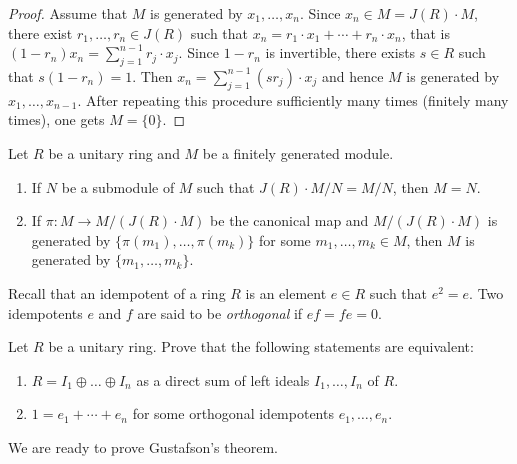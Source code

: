 \begin{proof}
	Assume that $M$ is generated by 
    $x_1,\dots,x_n$. Since $x_n\in M=J(R)\cdot M$, 
	there exist $r_1,\dots,r_n\in J(R)$ such that  $x_n=r_1\cdot x_1+\cdots+r_n\cdot x_n$, that is 
	$(1-r_n)x_n=\sum_{j=1}^{n-1}r_j\cdot x_j$. 
	Since $1-r_n$ is invertible, there exists 
    $s\in R$ such that $s(1-r_n)=1$. Then
	$x_n=\sum_{j=1}^{n-1}(sr_j)\cdot x_j$ 
	and hence $M$ is generated by $x_1,\dots,x_{n-1}$. After repeating this procedure sufficiently many times (finitely many times), one gets $M=\{0\}$.
\end{proof}

\begin{exercise}
\label{xca:Nakayama}
    Let $R$ be a unitary ring and $M$ be a finitely
    generated module. 
    \begin{enumerate}
        \item If $N$ be a submodule of $M$ such that $J(R)\cdot M/N=M/N$, then $M=N$. 
        \item If $\pi\colon M\to M/(J(R)\cdot M)$ be the canonical map and 
            $M/(J(R)\cdot M)$ is generated by $\{\pi(m_1),\dots,\pi(m_k)\}$ for some 
            $m_1,\dots,m_k\in M$, then $M$ is generated by $\{m_1,\dots,m_k\}$. 
    \end{enumerate}
\end{exercise}

Recall that an idempotent of a ring $R$ is an element $e\in R$ such that $e^2=e$. Two idempotents 
$e$ and $f$ are said to be \emph{orthogonal} if $ef=fe=0$. 

\begin{exercise}
    \label{xca:idempotents_decomposition}
    Let $R$ be a unitary ring. Prove that the following statements are equivalent: 
    \begin{enumerate}
        \item $R = I_1 \oplus \ldots \oplus I_n$ as a direct sum of left ideals $I_1,\dots,I_n$ of $R$. 
        \item $1=e_1+\cdots+e_n$ for some orthogonal idempotents $e_1,\dots,e_n$.
    \end{enumerate}
\end{exercise}


We are ready to prove Gustafson's theorem. 

